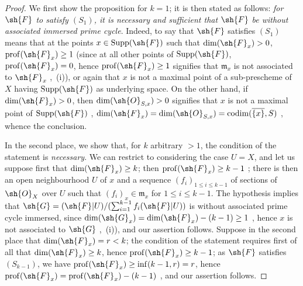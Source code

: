 \begin{proof}
We first show the proposition for $k=1$; it is then stated as follows: \emph{for $\sh{F}$ to satisfy $(S_1)$, it is necessary and sufficient that $\sh{F}$ be without associated immersed prime cycle}.
Indeed, to say that $\sh{F}$ satisfies $(S_1)$ means that at the points $x\in\operatorname{Supp}(\sh{F})$ such that $\dim(\sh{F}_x)>0$, $\operatorname{prof}(\sh{F}_x)\geq 1$ (since at all other points of $\operatorname{Supp}(\sh{F})$, $\operatorname{prof}(\sh{F}_x)=0$, hence $\operatorname{prof}(\sh{F}_x)\geq 1$ signifies that $\mathfrak{m}_x$ is not associated to $\sh{F}_x$ ,~(i)), or again that $x$ is not a maximal point of a sub-prescheme of $X$ having $\operatorname{Supp}(\sh{F})$ as underlying space.
On the other hand, if $\dim(\sh{F}_x)>0$, then $\dim(\sh{O}_{S,x})>0$ signifies that $x$ is not a maximal point of $\operatorname{Supp}(\sh{F})$ , $\dim(\sh{F}_x)=\dim(\sh{O}_{S,x})=\operatorname{codim}(\overline{\{x\}},S)$ , whence the conclusion.

In the second place, we show that, for $k$ arbitrary $>1$, the condition of the statement is \emph{necessary}.
We can restrict to considering the case $U=X$, and let us suppose first that $\dim(\sh{F}_x)\geq k$; then $\operatorname{prof}(\sh{F}_x)\geq k-1$ ; there is then an open neighbourhood $U$ of $x$ and a sequence $(f_i)_{1\leq i\leq k-1}$ of sections of $\sh{O}_X$ over $U$ such that $(f_i)_x\in\mathfrak{m}_x$ for $1\leq i\leq k-1$.
The hypothesis implies that $\sh{G}=(\sh{F}|U)/(\sum_{i=1}^{k-1}f_i(\sh{F}|U))$ is without associated prime cycle immersed, since $\dim(\sh{G}_x)=\dim(\sh{F}_x)-(k-1)\geq 1$ , hence $x$ is not associated to $\sh{G}$ ,~(i)), and our assertion follows.
Suppose in the second place that $\dim(\sh{F}_x)=r<k$; the condition of the statement requires first of all that $\dim(\sh{F}_x)\geq k$, hence $\operatorname{prof}(\sh{F}_x)\geq k-1$; as $\sh{F}$ satisfies $(S_{k-1})$, we have $\operatorname{prof}(\sh{F}_x)\geq\inf(k-1,r)=r$, hence $\operatorname{prof}(\sh{F}_x)=\operatorname{prof}(\sh{F}_x)-(k-1)$ , and our assertion follows.


\end{proof}
